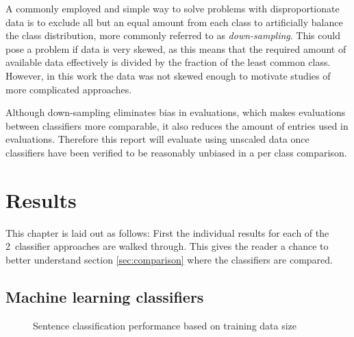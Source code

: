 \documentclass[a4paper,11pt]{kth-mag}
\newcommand{\numClassifierAproaches}{2}
\begin{document}
A commonly employed and simple way to solve problems with disproportionate data
is to exclude all but an equal amount from each class to artificially balance the class distribution,
more commonly referred to as \emph{down-sampling}\cite{provost2000machine}.
This could pose a problem if data is very skewed, as this means that the required
amount of available data effectively is divided by the fraction of the least common class.
However, in this work the data was not skewed enough to motivate studies of more
complicated approaches.

Although down-sampling eliminates bias in evaluations, which makes evaluations between
classifiers more comparable, it also reduces the amount of entries used in evaluations.
Therefore this report will evaluate using unscaled data once classifiers have been
verified to be reasonably unbiased in a per class comparison.


\section{Results}

This chapter is laid out as follows: First the individual results for each of the \numClassifierAproaches~classifier approaches are walked through. This gives the reader a chance to better understand section \ref{sec:comparison} where the classifiers are compared.


\subsection{Machine learning classifiers}

\begin{figure}[h]
  \centering

  \caption{Sentence classification performance based on training data size}
  \label{fig:data_size}
\end{figure}
\end{document}
